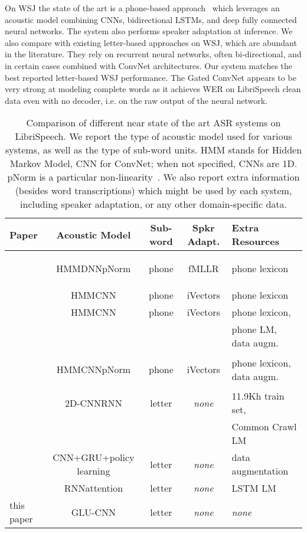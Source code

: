\documentclass{article}
\begin{document}
On WSJ the state of the art is a phone-based approach~\citep{chan2015rnn} which leverages an acoustic model
combining CNNs, bidirectional LSTMs, and deep fully connected neural
networks. The system also performs speaker adaptation at inference. We also
compare with existing letter-based approaches on WSJ, which are abundant in
the literature. They rely on recurrent neural networks, often
bi-directional, and in certain cases combined with ConvNet
architectures. Our system matches the best reported letter-based WSJ
performance. The Gated ConvNet appears to be very strong at modeling
complete words as it achieves  WER on LibriSpeech clean data even with no decoder,
i.e. on the raw output of the neural network.





\begin{table*}
  \caption{Comparison of different near state of the art ASR systems on
    LibriSpeech. We report the type of acoustic model used for various
    systems, as well as the type of sub-word units. HMM stands for Hidden
    Markov Model, CNN for ConvNet; when not specified, CNNs are 1D. pNorm
    is a particular non-linearity~\citep{zhang2014pnorm}. We also report
    extra information (besides word transcriptions) which might be used by
    each system, including speaker adaptation, or any other domain-specific
    data. }
    \label{tbl-systems}
    \begin{center}
\setlength{\tabcolsep}{3.2pt}
    \small
    \begin{tabular}{lcccl}
      \toprule
      Paper & Acoustic Model & Sub-word & Spkr Adapt. & Extra Resources \\ \midrule
      \cite{panayotov2015librispeech} & \begin{scriptsize}HMMDNNpNorm\end{scriptsize} & phone & fMLLR & phone lexicon \\
      \cite{peddinti2015time} & HMMCNN & phone & iVectors & phone lexicon \\
      \cite{povey2016mmi} & HMMCNN & phone & iVectors & phone lexicon, \\
      &  &  &  & phone LM, data augm.\\
      \cite{ko2015audio} & \begin{scriptsize}HMMCNNpNorm\end{scriptsize} & phone & iVectors & phone lexicon, data augm. \\
      \midrule
        \cite{amodei2015deep} & 2D-CNNRNN & letter & \emph{none} & 11.9Kh train set, \\
        &  &  &  & Common Crawl LM \\
        \cite{zhou2018policy} & CNN+GRU+policy learning & letter & \emph{none} & data augmentation \\
      \cite{zeyer2018improved} & RNNattention & letter & \emph{none} & LSTM LM \\
      this paper & GLU-CNN & letter & \emph{none} & \emph{none} \\
      \bottomrule
    \end{tabular}
    \end{center}
\end{table*}
\end{document}

